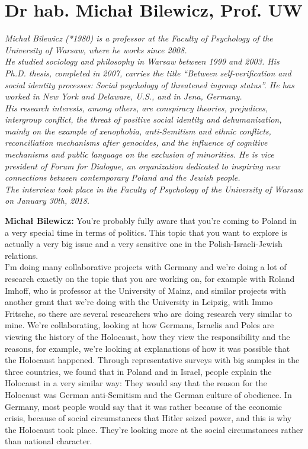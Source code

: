 \section{Dr hab. Michał Bilewicz, Prof. UW}

\textit{Michał Bilewicz (*1980) is a professor at the Faculty of Psychology of the University of Warsaw, where he works since 2008. \\
He studied sociology and philosophy in Warsaw between 1999 and 2003. His Ph.D. thesis, completed in 2007, carries the title ``Between self-verification and social identity processes: Social psychology of threatened ingroup status''. 
He has worked in New York and Delaware, U.S., and in Jena, Germany. \\
His research interests, among others, are conspiracy theories, prejudices, intergroup conflict, the threat of positive social identity and dehumanization, mainly on the example of xenophobia, anti-Semitism and ethnic conflicts, reconciliation mechanisms after genocides, and the influence of cognitive mechanisms and public language on the exclusion of minorities.
He is vice president of Forum for Dialogue, an organization dedicated to inspiring new connections between contemporary Poland and the Jewish people. \\
The interview took place in the Faculty of Psychology of the University of Warsaw on January 30th, 2018.}\par
\vspace*{2em}
\textbf{Michał Bilewicz:} You're probably fully aware that you're coming to Poland in a very special time in terms of politics. This topic that you want to explore is actually a very big issue and a very sensitive one in the Polish-Israeli-Jewish relations.\\
I'm doing many collaborative projects with Germany and we're doing a lot of research exactly on the topic that you are working on, for example with Roland Imhoff, who is professor at the University of Mainz, and similar projects with another grant that we're doing with the University in Leipzig, with Immo Fritsche, so there are several researchers who are doing research very similar to mine. We're collaborating, looking at how Germans, Israelis and Poles are viewing the history of the Holocaust, how they view the responsibility and the reasons, for example, we're looking at explanations of how it was possible that the Holocaust happened. Through representative surveys with big samples in the three countries, we found that in Poland and in Israel, people explain the Holocaust in a very similar way: They would say that the reason for the Holocaust was German anti-Semitism and the German culture of obedience. In Germany, most people would say that it was rather because of the economic crisis, because of social circumstances that Hitler seized power, and this is why the Holocaust took place. They're looking more at the social circumstances rather than national character.\\\
